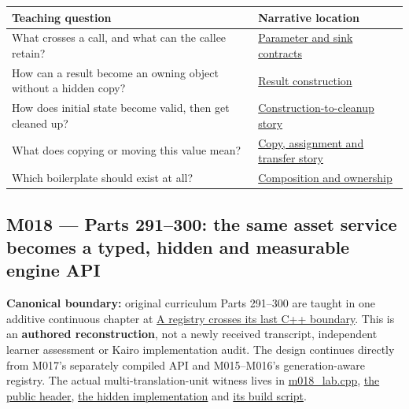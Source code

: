 {\def\LTcaptype{none} %
\begin{longtable}[]{@{}
  >{\raggedright\arraybackslash}p{}
  >{\raggedright\arraybackslash}p{}@{}}
\toprule\noalign{}
\begin{minipage}[b]{\linewidth}\raggedright
Teaching question
\end{minipage} & \begin{minipage}[b]{\linewidth}\raggedright
Narrative location
\end{minipage} \\
\midrule\noalign{}
\endhead
\bottomrule\noalign{}
\endlastfoot
What crosses a call, and what can the callee retain? & \hyperref[01-foundations-i-ch003-a-value-crosses-the-function-boundary]{Parameter and sink contracts} \\
How can a result become an owning object without a hidden copy? & \hyperref[01-foundations-i-ch003-return-a-result-without-handing-out-a-lifetime-problem]{Result construction} \\
How does initial state become valid, then get cleaned up? & \hyperref[01-foundations-i-ch003-construction-establishes-a-usable-state]{Construction-to-cleanup story} \\
What does copying or moving this value mean? & \hyperref[01-foundations-i-ch003-copy-a-meaning-rather-than-just-its-bytes]{Copy, assignment and transfer story} \\
Which boilerplate should exist at all? & \hyperref[01-foundations-i-ch003-from-three-repairs-to-five-decisions-to-zero-boilerplate]{Composition and ownership} \\
\end{longtable}
}

\subsection{M018 --- Parts 291--300: the same asset service becomes a typed, hidden and measurable engine API}\label{appendix-fd090d982a15-m018-parts-291300-the-same-asset-service-becomes-a-typed-hidden-and-measurable-engine-api}

\hypertarget{appendix-fd090d982a15-m018-parts-291300-the-same-asset-service-becomes-a-typed-hidden-and-measurable-engine-api}{}

\textbf{Canonical boundary:} original curriculum Parts 291--300 are taught in one additive continuous chapter at \hyperref[01-foundations-i-ch007-a-registry-crosses-its-last-c-boundary-hidden-implementation-typed-identity-and-measured-abstraction-cost]{A registry crosses its last C++ boundary}. This is an \textbf{authored reconstruction}, not a newly received transcript, independent learner assessment or Kairo implementation audit. The design continues directly from M017's separately compiled API and M015--M016's generation-aware registry. The actual multi-translation-unit witness lives in \hyperref[source-file-8aedc3fdcd10c91971507448]{m018\_lab.cpp}, \hyperref[source-file-0529c78555b675a2ae111228]{the public header}, \hyperref[source-file-04abded74b7e03edc5dcf870]{the hidden implementation} and \hyperref[source-file-c936569afa19be638ec87991]{its build script}.


